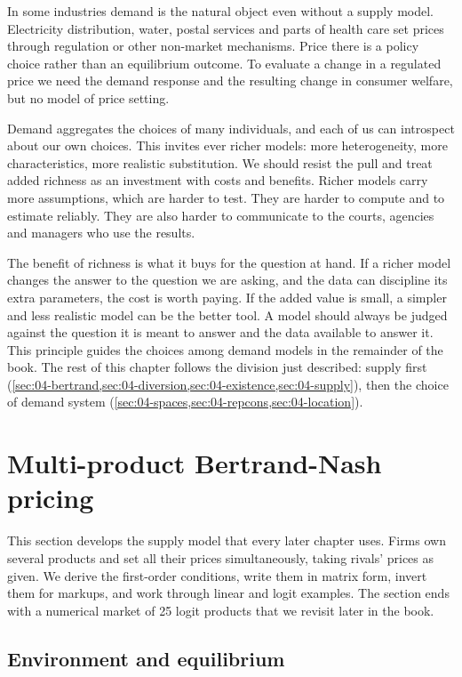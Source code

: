 In some industries demand is the natural object even without a supply model. Electricity distribution, water,
postal services and parts of health care set prices through regulation or other non-market mechanisms. Price
there is a policy choice rather than an equilibrium outcome. To evaluate a change in a regulated price we need
the demand response and the resulting change in consumer welfare, but no model of price setting.

Demand aggregates the choices of many individuals, and each of us can introspect about our own choices. This
invites ever richer models: more heterogeneity, more characteristics, more realistic substitution. We should
resist the pull and treat added richness as an investment with costs and benefits. Richer models carry more
assumptions, which are harder to test. They are harder to compute and to estimate reliably. They are also harder
to communicate to the courts, agencies and managers who use the results.

The benefit of richness is what it buys for the question at hand. If a richer model changes the answer to the
question we are asking, and the data can discipline its extra parameters, the cost is worth paying. If the added
value is small, a simpler and less realistic model can be the better tool. A model should always be judged
against the question it is meant to answer and the data available to answer it. This principle guides the
choices among demand models in the remainder of the book. The rest of this chapter follows the division just
described: supply first (\cref{sec:04-bertrand,sec:04-diversion,sec:04-existence,sec:04-supply}), then the choice
of demand system (\cref{sec:04-spaces,sec:04-repcons,sec:04-location}).

\section{Multi-product Bertrand-Nash pricing}\label{sec:04-bertrand}

This section develops the supply model that every later chapter uses. Firms own several products and set all
their prices simultaneously, taking rivals' prices as given. We derive the first-order conditions, write them in
matrix form, invert them for markups, and work through linear and logit examples. The section ends with a
numerical market of 25 logit products that we revisit later in the book.

\subsection{Environment and equilibrium}\label{sec:04-bertrand-setup}

